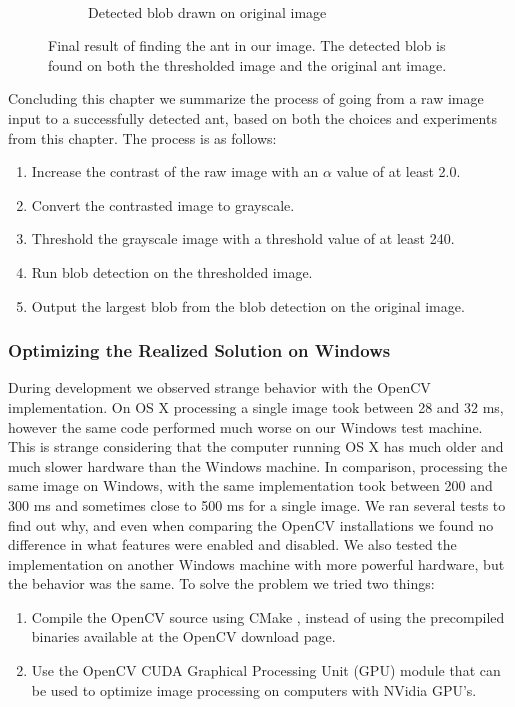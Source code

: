 \begin{figure}
\begin{subfigure}[b]{0.45\textwidth}
                \caption{\mbox{}\\Detected blob drawn on original image}
        \end{subfigure}
		\caption{Final result of finding the ant in our image. The detected blob is found on both the thresholded image and the original ant image.}
		\label{fig:finalResult}
\end{figure}

Concluding this chapter we summarize the process of going from a raw image input to a successfully detected ant, based on both the choices and experiments from this chapter. The process is as follows:

\begin{enumerate}
    \item Increase the contrast of the raw image with an $\alpha$ value of at least 2.0.
    \item Convert the contrasted image to grayscale.
    \item Threshold the grayscale image with a threshold value of at least 240.
    \item Run blob detection on the thresholded image.
    \item Output the largest blob from the blob detection on the original image.
\end{enumerate}

\subsubsection{Optimizing the Realized Solution on Windows} \mbox{}\par
\label{sec:optimizing}
During development we observed strange behavior with the OpenCV implementation. On OS X processing a single image took between 28 and 32 ms, however the same code performed much worse on our Windows test machine. This is strange considering that the computer running OS X has much older and much slower hardware than the Windows machine. In comparison, processing the same image on Windows, with the same implementation took between 200 and 300 ms and sometimes close to 500 ms for a single image. We ran several tests to find out why, and even when comparing the OpenCV installations we found no difference in what features were enabled and disabled. We also tested the implementation on another Windows machine with more powerful hardware, but the behavior was the same. To solve the problem we tried two things:\\

\begin{enumerate}
    \item Compile the OpenCV source using CMake \cite{cmake}, instead of using the precompiled binaries available at the OpenCV download page.
    \item Use the OpenCV CUDA \cite{cuda} Graphical Processing Unit (GPU) module that can be used to optimize image processing on computers with NVidia GPU's.
\end{enumerate}

